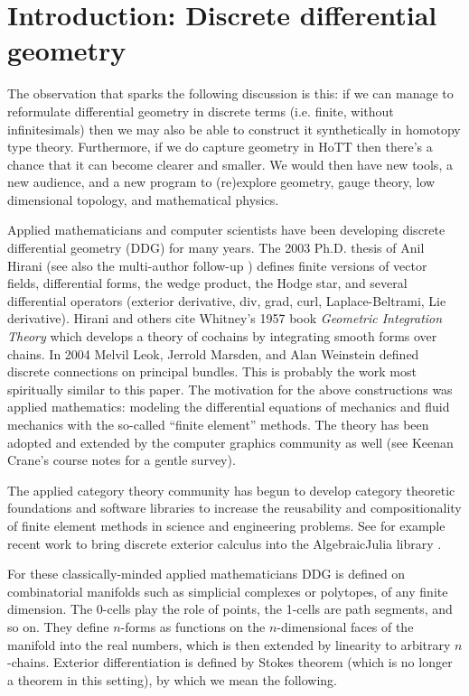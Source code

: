 \section{Introduction: Discrete differential geometry}

The observation that sparks the following discussion is this: if we can manage to reformulate differential geometry in discrete terms (i.e. finite, without infinitesimals) then we may also be able to construct it synthetically in homotopy type theory. Furthermore, if we do capture geometry in HoTT then there's a chance that it can become clearer and smaller. We would then have new tools, a new audience, and a new program to (re)explore geometry, gauge theory, low dimensional topology, and mathematical physics.

Applied mathematicians and computer scientists have been developing discrete differential geometry (DDG) for many years. The 2003 Ph.D. thesis of Anil Hirani \cite{hiranidec} (see also the multi-author follow-up \cite{desbrundec}) defines finite versions of vector fields, differential forms, the wedge product, the Hodge star, and several differential operators (exterior derivative, div, grad, curl, Laplace-Beltrami, Lie derivative). Hirani and others cite Whitney's 1957 book \emph{Geometric Integration Theory}\cite{whitney1957} which develops a theory of cochains by integrating smooth forms over chains. In 2004 Melvil Leok, Jerrold Marsden, and Alan Weinstein \cite{leok} defined discrete connections on principal bundles. This is probably the work most spiritually similar to this paper. The motivation for the above constructions was applied mathematics: modeling the differential equations of mechanics and fluid mechanics with the so-called ``finite element'' methods. The theory has been adopted and extended by the computer graphics community as well (see Keenan Crane's course notes \cite{crane_ddg} for a gentle survey).

The applied category theory community has begun to develop category theoretic foundations and software libraries to increase the reusability and compositionality of finite element methods in science and engineering problems. See for example recent work to bring discrete exterior calculus into the AlgebraicJulia library \cite{morris_decapodes} \cite{patterson_diffeq}.

For these classically-minded applied mathematicians DDG is defined on combinatorial manifolds such as simplicial complexes or polytopes, of any finite dimension. The 0-cells play the role of points, the 1-cells are path segments, and so on. They define \( n \)-forms as functions on the \( n \)-dimensional faces of the manifold into the real numbers, which is then extended by linearity to arbitrary \( n \)-chains. Exterior differentiation is defined by Stokes theorem (which is no longer a theorem in this setting), by which we mean the following. 

